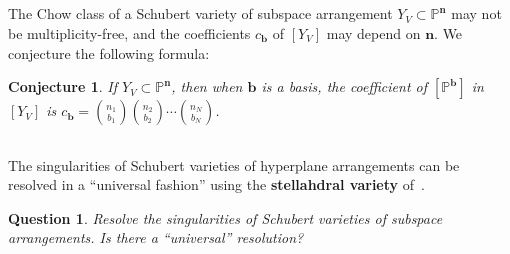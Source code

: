 \documentclass[11pt]{article}
\newtheorem{ques}[theo]{Question}
\newtheorem{conj}[theo]{Conjecture}
\theoremstyle{definition}
\numberwithin{equation}{section}
\renewcommand{\P}{\mathbb{P}}
\newcommand{\word}[1]{\textbf{#1}}
\newcommand{\revision}[1]{{#1}}
\begin{document}
\subsection{}
The Chow class of a Schubert variety of subspace arrangement $Y_V \subset \P^{\mathbf n}$ may not be multiplicity-free, and the coefficients $c_{\mathbf b}$ of $[Y_V]$ may depend on $\mathbf n$.
We conjecture the following formula:
\begin{conj}
  If $Y_V \subset \P^{\mathbf n}$, then \revision{when $\mathbf b$ is a basis,} the coefficient of $[\P^{\mathbf b}]$ in $[Y_V]$ is $c_{\mathbf b} = \binom{n_1}{b_1}\binom{n_2}{b_2} \cdots \binom{n_N}{b_N}$.
\end{conj}
\subsection{}
The singularities of Schubert varieties of hyperplane arrangements can be resolved in a ``universal fashion'' using the \word{stellahdral variety} of~\cite{BHMPW20}.
\begin{ques}
  Resolve the singularities of Schubert varieties of subspace arrangements. Is there a ``universal'' resolution?
\end{ques}
\end{document}

